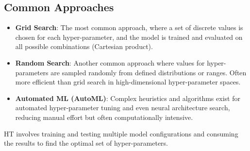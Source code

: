 \documentclass{article}
\begin{document}
\subsection*{Common Approaches}
\begin{itemize}
    \item \textbf{Grid Search}: The most common approach, where a set of discrete values is chosen for each hyper-parameter, and the model is trained and evaluated on all possible combinations (Cartesian product).
    \item \textbf{Random Search}: Another common approach where values for hyper-parameters are sampled randomly from defined distributions or ranges. Often more efficient than grid search in high-dimensional hyper-parameter spaces.
    \item \textbf{Automated ML (AutoML)}: Complex heuristics and algorithms exist for automated hyper-parameter tuning and even neural architecture search, reducing manual effort but often computationally intensive.
\end{itemize}
HT involves training and testing multiple model configurations and consuming the results to find the optimal set of hyper-parameters.
\end{document}
